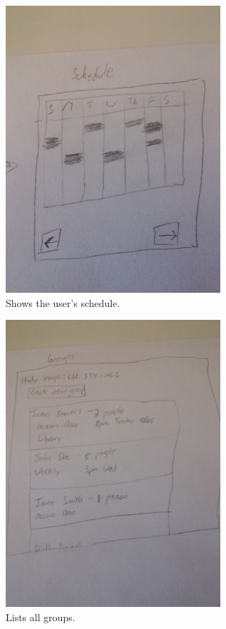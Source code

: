 \documentclass[conference]{IEEEtran}
\begin{document}
\begin{figure}[ht!]
\centering
\includegraphics[width=80mm]{figures/schedule}
\caption{Shows the user's schedule. \label{fig:schedule}}
\end{figure}

\begin{figure}[ht!]
\centering
\includegraphics[width=80mm]{figures/groups}
\caption{Lists all groups. \label{fig:groups}}
\end{figure}
\end{document}
